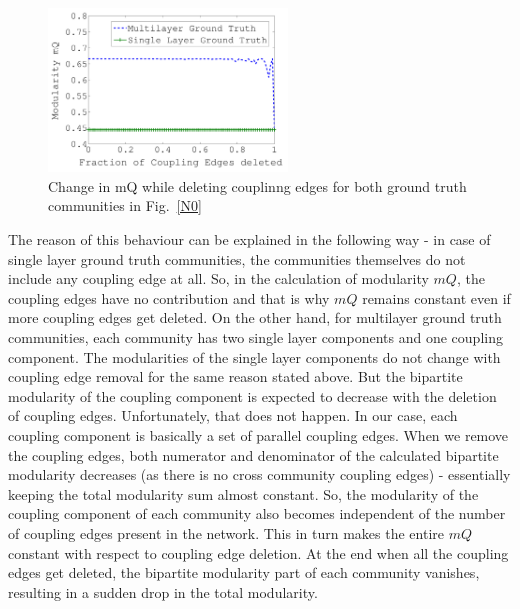 \begin{figure}
\centering
\includegraphics[width=2.5in]{./images/mQ_config1_2_100_5_no_ext_random_removal.pdf}
\vspace{-0.1in}
\caption{Change in mQ while deleting couplinng edges for both ground truth communities in Fig.~\ref{N0}}
\vspace{-0.1in}
\label{mQ1}
\end{figure}

The reason of this behaviour can be explained in the following way - in case of
single layer ground truth communities, the communities themselves do not include any coupling edge at all. So, in the calculation 
of modularity $mQ$, the coupling edges have no contribution and that is why $mQ$ remains constant even 
if more coupling edges get deleted.
On the other hand, for multilayer ground truth communities, each community has two single layer components and one coupling component.
The modularities of the single layer components do not change with coupling edge removal for the same reason stated above. 
But the bipartite modularity of the coupling component is expected to decrease with the deletion of coupling edges. 
Unfortunately, that does not happen. 
In our case, each coupling component is basically a set of parallel coupling edges.
When we remove the coupling edges, both numerator and denominator of the calculated bipartite modularity decreases (as there is no cross
community coupling edges) - essentially keeping
the total modularity sum almost constant.
So, the modularity of the coupling component of each community also becomes independent of the number of coupling edges present in the
network. This in turn makes the entire $mQ$ constant with respect to coupling edge deletion.
At the end when all the coupling edges get deleted, the bipartite modularity part of each community vanishes, resulting in a sudden drop in 
the total modularity.

